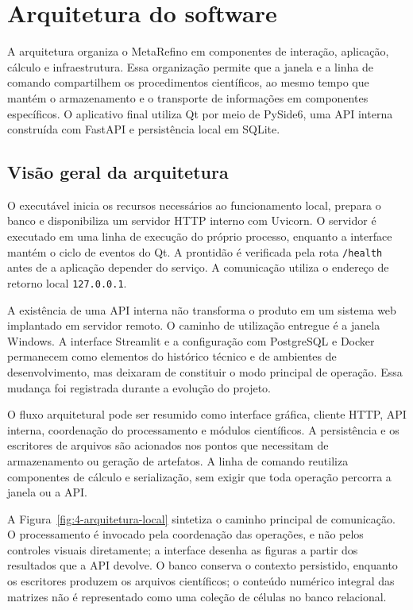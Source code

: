 \section{Arquitetura do software}
\label{sec:4-arquitetura}

A arquitetura organiza o MetaRefino em componentes de interação, aplicação, cálculo e infraestrutura. Essa organização permite que a janela e a linha de comando compartilhem os procedimentos científicos, ao mesmo tempo que mantém o armazenamento e o transporte de informações em componentes específicos. O aplicativo final utiliza Qt por meio de PySide6, uma API interna construída com FastAPI e persistência local em SQLite.

\subsection{Visão geral da arquitetura}

O executável inicia os recursos necessários ao funcionamento local, prepara o banco e disponibiliza um servidor HTTP interno com Uvicorn. O servidor é executado em uma linha de execução do próprio processo, enquanto a interface mantém o ciclo de eventos do Qt. A prontidão é verificada pela rota \texttt{/health} antes de a aplicação depender do serviço. A comunicação utiliza o endereço de retorno local \texttt{127.0.0.1}.

A existência de uma API interna não transforma o produto em um sistema web implantado em servidor remoto. O caminho de utilização entregue é a janela Windows. A interface Streamlit e a configuração com PostgreSQL e Docker permanecem como elementos do histórico técnico e de ambientes de desenvolvimento, mas deixaram de constituir o modo principal de operação. Essa mudança foi registrada durante a evolução do projeto.

O fluxo arquitetural pode ser resumido como interface gráfica, cliente HTTP, API interna, coordenação do processamento e módulos científicos. A persistência e os escritores de arquivos são acionados nos pontos que necessitam de armazenamento ou geração de artefatos. A linha de comando reutiliza componentes de cálculo e serialização, sem exigir que toda operação percorra a janela ou a API.

A Figura~\ref{fig:4-arquitetura-local} sintetiza o caminho principal de comunicação. O processamento é invocado pela coordenação das operações, e não pelos controles visuais diretamente; a interface desenha as figuras a partir dos resultados que a API devolve. O banco conserva o contexto persistido, enquanto os escritores produzem os arquivos científicos; o conteúdo numérico integral das matrizes não é representado como uma coleção de células no banco relacional.

